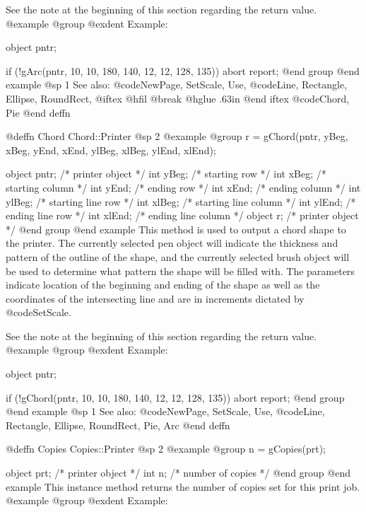 See the note at the beginning of this section regarding the return value.
@example
@group
@exdent Example:

object  pntr;

if (!gArc(pntr, 10, 10, 180, 140, 12, 12, 128, 135))
        abort report;
@end group
@end example
@sp 1
See also:  @code{NewPage, SetScale, Use,}
        @code{Line, Rectangle, Ellipse, RoundRect,}
@iftex
@hfil @break @hglue .63in 
@end iftex
@code{Chord, Pie}
@end deffn












@deffn {Chord} Chord::Printer
@sp 2
@example
@group
r = gChord(pntr, yBeg, xBeg, yEnd, xEnd,
                 ylBeg, xlBeg, ylEnd, xlEnd);

object  pntr;   /*  printer object         */
int     yBeg;   /*  starting row           */
int     xBeg;   /*  starting column        */
int     yEnd;   /*  ending row             */
int     xEnd;   /*  ending column          */
int     ylBeg;  /*  starting line row      */
int     xlBeg;  /*  starting line column   */
int     ylEnd;  /*  ending line row        */
int     xlEnd;  /*  ending line column     */
object  r;      /*  printer object         */
@end group
@end example
This method is used to output a chord shape to the printer.  The
currently selected pen object will indicate the thickness and pattern of
the outline of the shape, and the currently selected brush object will
be used to determine what pattern the shape will be filled with.  The
parameters indicate location of the beginning and ending of the shape as
well as the coordinates of the intersecting line and are in increments
dictated by @code{SetScale}.

See the note at the beginning of this section regarding the return value.
@example
@group
@exdent Example:

object  pntr;

if (!gChord(pntr, 10, 10, 180, 140, 12, 12, 128, 135))
        abort report;
@end group
@end example
@sp 1
See also:  @code{NewPage, SetScale, Use,}
        @code{Line, Rectangle, Ellipse, RoundRect, Pie, Arc}
@end deffn




@deffn {Copies} Copies::Printer
@sp 2
@example
@group
n = gCopies(prt);

object  prt;  /*  printer object     */
int     n;    /*  number of copies   */
@end group
@end example
This instance method returns the number of copies set for this print job.
@example
@group
@exdent Example:

